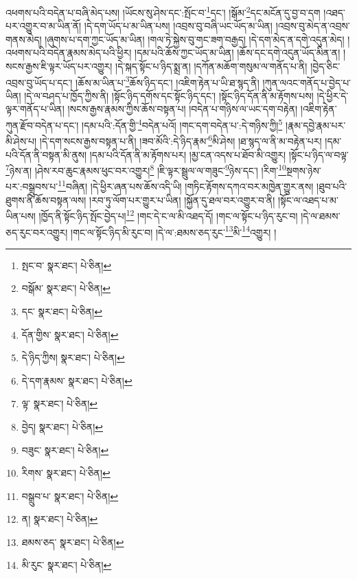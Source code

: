 འཕགས་པའི་བདེན་པ་བཞི་མེད་པས། །ཡོངས་སུ་ཤེས་དང་:སྤོང་བ་\footnote{སྤང་བ་  སྣར་ཐང་།  པེ་ཅིན། }དང་། །སྒོམ་\footnote{བསྒོམ་  སྣར་ཐང་།  པེ་ཅིན། }དང་མངོན་དུ་བྱ་བ་དག །འཐད་པར་འགྱུར་བ་མ་ཡིན་ནོ། །དེ་དག་ཡོད་པ་མ་ཡིན་པས། །འབྲས་བུ་བཞི་ཡང་ཡོད་མ་ཡིན། །འབྲས་བུ་མེད་ན་འབྲས་གནས་མེད། །ཞུགས་པ་དག་ཀྱང་ཡོད་མ་ཡིན། །གལ་ཏེ་སྐྱེས་བུ་གང་ཟག་བརྒྱད། །དེ་དག་མེད་ན་དགེ་འདུན་མེད། །འཕགས་པའི་བདེན་རྣམས་མེད་པའི་ཕྱིར། །དམ་པའི་ཆོས་ཀྱང་ཡོད་མ་ཡིན། །ཆོས་དང་དགེ་འདུན་ཡོད་མིན་ན། །སངས་རྒྱས་ཇི་ལྟར་ཡོད་པར་འགྱུར། །དེ་སྐད་སྟོང་པ་ཉིད་སྨྲ་ན། །དཀོན་མཆོག་གསུམ་ལ་གནོད་པ་ནི། །བྱེད་ཅིང་འབྲས་བུ་ཡོད་པ་དང་། །ཆོས་མ་ཡིན་པ་\footnote{དང་  སྣར་ཐང་།  པེ་ཅིན། }ཆོས་ཉིད་དང་། །འཇིག་རྟེན་པ་ཡི་ཐ་སྙད་ནི། །ཀུན་ལའང་གནོད་པ་བྱེད་པ་ཡིན། །དེ་ལ་བཤད་པ་ཁྱོད་ཀྱིས་ནི། །སྟོང་ཉིད་དགོས་དང་སྟོང་ཉིད་དང་། །སྟོང་ཉིད་དོན་ནི་མ་རྟོགས་པས། །དེ་ཕྱིར་དེ་ལྟར་གནོད་པ་ཡིན། །སངས་རྒྱས་རྣམས་ཀྱིས་ཆོས་བསྟན་པ། །བདེན་པ་གཉིས་ལ་ཡང་དག་བརྟེན། །འཇིག་རྟེན་ཀུན་རྫོབ་བདེན་པ་དང་། །དམ་པའི་:དོན་གྱི་\footnote{དོན་གྱིས་  སྣར་ཐང་།  པེ་ཅིན། }བདེན་པའོ། །གང་དག་བདེན་པ་:དེ་གཉིས་ཀྱི།\footnote{དེ་ཉིད་ཀྱིས།  སྣར་ཐང་།  པེ་ཅིན། } །རྣམ་དབྱེ་རྣམ་པར་མི་ཤེས་པ། །དེ་དག་སངས་རྒྱས་བསྟན་པ་ནི། །ཟབ་མོའི་:དེ་ཉིད་རྣམ་\footnote{དེ་དག་རྣམས་  སྣར་ཐང་།  པེ་ཅིན། }མི་ཤེས། །ཐ་སྙད་ལ་ནི་མ་བརྟེན་པར། །དམ་པའི་དོན་ནི་བསྟན་མི་ནུས། །དམ་པའི་དོན་ནི་མ་རྟོགས་པར། །མྱ་ངན་འདས་པ་ཐོབ་མི་འགྱུར། །སྟོང་པ་ཉིད་ལ་བལྟ་\footnote{ལྟ་  སྣར་ཐང་།  པེ་ཅིན། }ཉེས་ན། །ཤེས་རབ་ཆུང་རྣམས་ཕུང་བར་འགྱུར།\footnote{བྱེད།  སྣར་ཐང་།  པེ་ཅིན། } །ཇི་ལྟར་སྦྲུལ་ལ་གཟུང་\footnote{བཟུང་  སྣར་ཐང་།  པེ་ཅིན། }ཉེས་དང་། །རིག་\footnote{རིགས་  སྣར་ཐང་།  པེ་ཅིན། }སྔགས་ཉེས་པར་:བསྒྲུབས་པ་\footnote{བསྒྲུབ་པ་  སྣར་ཐང་།  པེ་ཅིན། }བཞིན། །དེ་ཕྱིར་ཞན་པས་ཆོས་འདི་ཡི། །གཏིང་རྟོགས་དཀའ་བར་མཁྱེན་གྱུར་ནས། །ཐུབ་པའི་ཐུགས་ནི་ཆོས་བསྟན་ལས། །རབ་ཏུ་ལོག་པར་གྱུར་པ་ཡིན། །སྐྱོན་དུ་ཐལ་བར་འགྱུར་བ་ནི། །སྟོང་ལ་འཐད་པ་མ་ཡིན་པས། །ཁྱོད་ནི་སྟོང་ཉིད་སྤོང་བྱེད་པ།\footnote{ན།  སྣར་ཐང་།  པེ་ཅིན། } །གང་དེ་ང་ལ་མི་འཐད་དོ། །གང་ལ་སྟོང་པ་ཉིད་རུང་བ། །དེ་ལ་ཐམས་ཅད་རུང་བར་འགྱུར། །གང་ལ་སྟོང་ཉིད་མི་རུང་བ། །དེ་ལ་:ཐམས་ཅད་རུང་\footnote{ཐམས་ཅད་  སྣར་ཐང་།  པེ་ཅིན། }མི་\footnote{མི་རུང་  སྣར་ཐང་།  པེ་ཅིན། }འགྱུར། །

